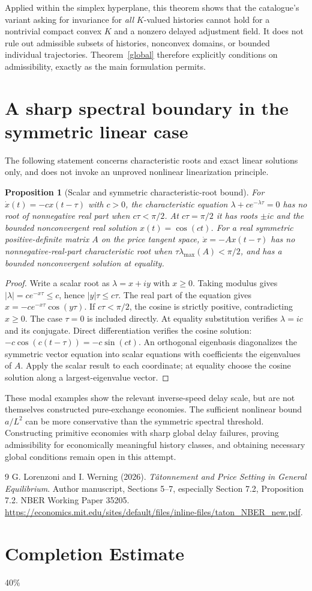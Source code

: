 \documentclass[11pt]{article}
\newtheorem{proposition}[theorem]{Proposition}
\theoremstyle{remark}
\begin{document}
Applied within the simplex hyperplane, this theorem shows that the
catalogue's variant asking for invariance for \emph{all} $K$-valued
histories cannot hold for a nontrivial compact convex $K$ and a
nonzero delayed adjustment field. It does not rule out admissible
subsets of histories, nonconvex domains, or bounded individual
trajectories. Theorem~\ref{global} therefore explicitly conditions on
admissibility, exactly as the main formulation permits.

\section{A sharp spectral boundary in the symmetric linear case}
The following statement concerns characteristic roots and exact linear
solutions only, and does not invoke an unproved nonlinear
linearization principle.

\begin{proposition}[Scalar and symmetric characteristic-root bound]
For $\dot x(t)=-c x(t-\tau)$ with $c>0$, the characteristic equation
$\lambda+c e^{-\lambda\tau}=0$ has no root of nonnegative real part
when $c\tau<\pi/2$. At $c\tau=\pi/2$ it has roots $\pm ic$ and the
bounded nonconvergent real solution $x(t)=\cos(ct)$.
For a real symmetric positive-definite matrix $A$ on the price tangent
space, $\dot x=-A x(t-\tau)$ has no nonnegative-real-part
characteristic root when $\tau\lambda_{\max}(A)<\pi/2$, and has a
bounded nonconvergent solution at equality.
\end{proposition}
\begin{proof}
Write a scalar root as $\lambda=x+iy$ with $x\geq0$.
Taking modulus gives $|\lambda|=c e^{-x\tau}\leq c$, hence
$|y|\tau\leq c\tau$. The real part of the equation gives
$x=-c e^{-x\tau}\cos(y\tau)$. If $c\tau<\pi/2$, the cosine is
strictly positive, contradicting $x\geq0$. The case $\tau=0$ is
included directly. At equality substitution verifies $\lambda=ic$
and its conjugate. Direct differentiation verifies the cosine solution:
$-c\cos(c(t-\tau))=-c\sin(ct)$.
An orthogonal eigenbasis diagonalizes the symmetric vector equation
into scalar equations with coefficients the eigenvalues of $A$.
Apply the scalar result to each coordinate; at equality choose the
cosine solution along a largest-eigenvalue vector.
\end{proof}

These modal examples show the relevant inverse-speed delay scale, but
are not themselves constructed pure-exchange economies. The sufficient
nonlinear bound $a/L^2$ can be more conservative than the symmetric
spectral threshold. Constructing primitive economies with sharp global
delay failures, proving admissibility for economically meaningful
history classes, and obtaining necessary global conditions remain open
in this attempt.
\begin{thebibliography}{9}
 G. Lorenzoni and I. Werning (2026).
\emph{T\^atonnement and Price Setting in General Equilibrium}.
Author manuscript, Sections 5--7, especially Section 7.2,
Proposition 7.2. NBER Working Paper 35205.
\url{https://economics.mit.edu/sites/default/files/inline-files/taton_NBER_new.pdf}.
\end{thebibliography}

\section{Completion Estimate}
40\%
\end{document}
